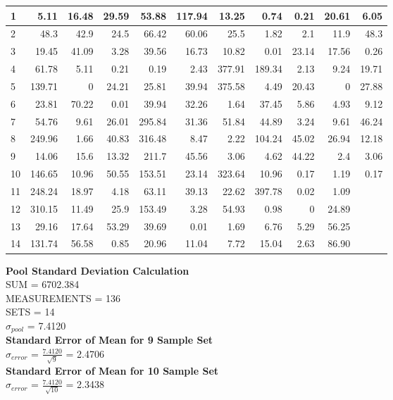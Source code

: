 \documentclass[12pt,a4paper,oneside]{article}
\begin{document}
\begin{tabular}{ |l | r | r | r | r | r | r | r | r | r | r | }
\hline
    1 & 5.11 & 16.48 & 29.59 & 53.88 & 117.94 & 13.25 & 0.74 & 0.21 & 20.61 & 6.05 \\ \hline
    2 & 48.3 & 42.9 & 24.5 & 66.42 & 60.06 & 25.5 & 1.82 & 2.1 & 11.9 & 48.3 \\ \hline
    3 & 19.45 & 41.09 & 3.28 & 39.56 & 16.73 & 10.82 & 0.01 & 23.14 & 17.56 & 0.26 \\ \hline
    4 & 61.78 & 5.11 & 0.21 & 0.19 & 2.43 & 377.91 & 189.34 & 2.13 & 9.24 & 19.71 \\ \hline
    5 & 139.71 & 0 & 24.21 & 25.81 & 39.94 & 375.58 & 4.49 & 20.43 & 0 & 27.88 \\ \hline
    6 & 23.81 & 70.22 & 0.01 & 39.94 & 32.26 & 1.64 & 37.45 & 5.86 & 4.93 & 9.12 \\ \hline
    7 & 54.76 & 9.61 & 26.01 & 295.84 & 31.36 & 51.84 & 44.89 & 3.24 & 9.61 & 46.24 \\ \hline
    8 & 249.96 & 1.66 & 40.83 & 316.48 & 8.47 & 2.22 & 104.24 & 45.02 & 26.94 & 12.18 \\ \hline
    9 & 14.06 & 15.6 & 13.32 & 211.7 & 45.56 & 3.06 & 4.62 & 44.22 & 2.4 & 3.06 \\ \hline
    10 &146.65 & 10.96 & 50.55 & 153.51 & 23.14 & 323.64 & 10.96 & 0.17 & 1.19 & 0.17 \\ \hline
    11 &248.24 & 18.97 & 4.18 & 63.11 & 39.13 & 22.62 & 397.78 & 0.02 & 1.09 &  \\ \hline
    12 &310.15 & 11.49 & 25.9 & 153.49 & 3.28 & 54.93 & 0.98 & 0 & 24.89 &  \\ \hline
    13 &29.16 & 17.64 & 53.29 & 39.69 & 0.01 & 1.69 & 6.76 & 5.29 & 56.25 &  \\ \hline
    14 &131.74 & 56.58 & 0.85 & 20.96 & 11.04 & 7.72 & 15.04 & 2.63 & 86.90 &  \\ \hline


	\end{tabular}
\newline
\newline

\textbf{Pool Standard Deviation Calculation} \\
{SUM             = 6702.384} \\
{MEASUREMENTS    = 136} \\ 
{SETS            = 14} \\
{$\sigma_{pool}$ = 7.4120}\\
\newline
\newline
\textbf{Standard Error of Mean for 9 Sample Set}\\
$\sigma_{error}$  = \(\frac{7.4120}{\sqrt{9}}\) =  2.4706\\
\newline
\newline
\textbf{Standard Error of Mean for 10 Sample Set}\\
$\sigma_{error}$  = \(\frac{7.4120}{\sqrt{10}}\) =  2.3438\\
\end{document}

